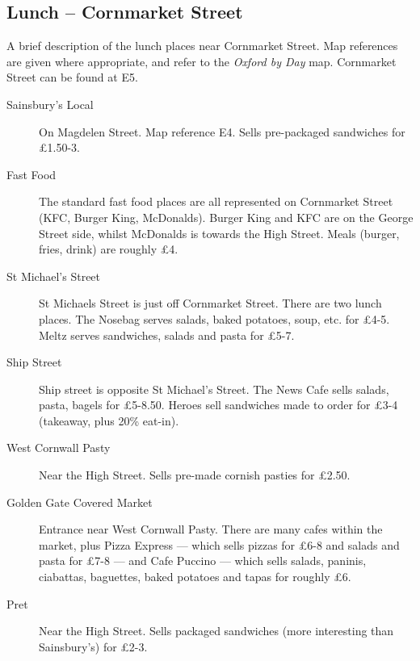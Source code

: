\subsection{Lunch -- Cornmarket Street}

A brief description of the lunch places near Cornmarket Street.  Map references are given where appropriate, and refer to the \textit{Oxford by Day} map.  Cornmarket Street can be found at E5.

\begin{description}

\item[Sainsbury's Local] On Magdelen Street. Map reference E4.  Sells pre-packaged sandwiches for \pounds 1.50-3.

\item[Fast Food] The standard fast food places are all represented on Cornmarket Street (KFC, Burger King, McDonalds).  Burger King and KFC are on the George Street side, whilst McDonalds is towards the High Street.  Meals (burger, fries, drink) are roughly \pounds 4.

\item[St Michael's Street]  St Michaels Street is just off Cornmarket Street.  There are two lunch places.  The Nosebag serves salads, baked potatoes, soup, etc. for \pounds 4-5.  Meltz serves sandwiches, salads and pasta for \pounds 5-7.

\item[Ship Street] Ship street is opposite St Michael's Street.  The News Cafe sells salads, pasta, bagels for \pounds 5-8.50.  Heroes sell sandwiches made to order for \pounds 3-4 (takeaway, plus 20\% eat-in).

\item[West Cornwall Pasty] Near the High Street.  Sells pre-made cornish pasties for \pounds 2.50.  

\item[Golden Gate Covered Market] Entrance near West Cornwall Pasty.  There are many cafes within the market, plus Pizza Express --- which sells pizzas for \pounds 6-8 and salads and pasta for \pounds 7-8 --- and Cafe Puccino --- which sells salads, paninis, ciabattas, baguettes, baked potatoes and tapas for roughly \pounds 6.  

\item[Pret] Near the High Street.  Sells packaged sandwiches (more interesting than Sainsbury's) for \pounds 2-3.

\end{description}

